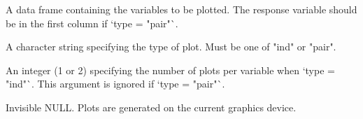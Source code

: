 \documentclass[a4paper]{book}
\begin{document}
%
\begin{Arguments}
\begin{ldescription}
\item[\code{data}] A data frame containing the variables to be plotted. The response
variable should be in the first column if `type = "pair"`.

\item[\code{type}] A character string specifying the type of plot. Must be one of
"ind" or "pair".

\item[\code{ppv}] An integer (1 or 2) specifying the number of plots per variable
when `type = "ind"`. This argument is ignored if `type = "pair"`.
\end{ldescription}
\end{Arguments}
%
\begin{Value}
Invisible NULL. Plots are generated on the current graphics device.
\end{Value}
%
\end{document}
